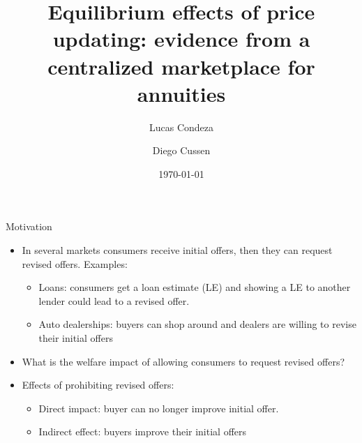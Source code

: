 \documentclass[10pt,aspectratio=169]{beamer}
\title{Equilibrium effects of price updating: evidence from a centralized marketplace for annuities}
\author{%
 Lucas Condeza
\inst{1} \and
Diego Cussen
\inst{2}
}
\institute{
  \inst{1} Yale University \\
  \inst{2} New York University
}
\date{\today}
\begin{document}
\begin{frame}
  \titlepage
\end{frame}




\begin{frame}{Motivation}\label{slide:motivation}
\begin{itemize}
    \item  In several markets consumers receive initial offers, then they can request revised offers. Examples: 
    \begin{itemize}
        \item Loans: consumers get a loan estimate (LE) and showing a LE to another lender could lead to a revised offer. \hyperlink{slide:fig_LE}{} %
        \item Auto dealerships: buyers can shop around and dealers are willing to revise their initial offers %
    \end{itemize}

    \item What is  the welfare impact of allowing consumers to request revised offers?
    \item Effects of prohibiting revised offers: 
    
    \begin{itemize}
        \item Direct impact: buyer can no longer improve initial offer. 
        \item Indirect effect: buyers improve their initial offers 
    \end{itemize}

    
\end{itemize}



\end{frame}
\end{document}
